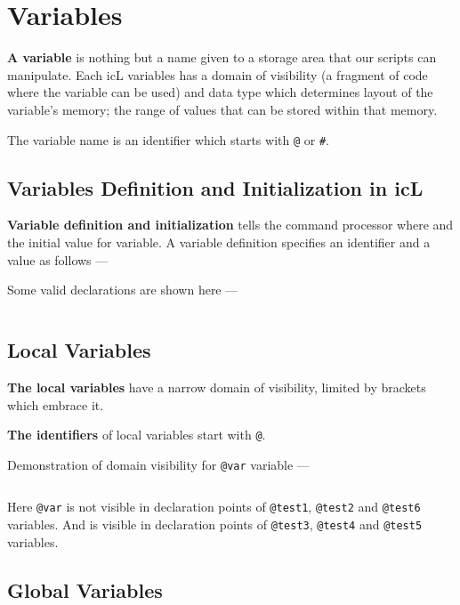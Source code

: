 \section{Variables}

\textbf{A variable} is nothing but a name given to a storage area that our scripts can manipulate. Each icL variables has a domain of visibility (a fragment of code where the variable can be used) and data type which determines layout of the variable's memory; the range of values that can be stored within that memory.

The variable name is an identifier which starts with \texttt{@} or \texttt{#}.

\subsection{Variables Definition and Initialization in icL}

\textbf{Variable definition and initialization} tells the command processor where and the initial value for variable. A variable definition specifies an identifier and a value as follows —

Some valid declarations are shown here —
\inputminted[linenos]{icl}{../sources/initexample.icL}

\subsection{Local Variables}

\textbf{The local variables} have a narrow domain of visibility, limited by brackets which embrace it.

{\bf The identifiers} of local variables start with \texttt{@}.

Demonstration of domain visibility for \texttt{@var} variable —
\inputminted[linenos]{icl}{../sources/localvars.icL}

Here \texttt{@var} is not visible in declaration points of \texttt{@test1}, \texttt{@test2} and \texttt{@test6} variables. And is visible in declaration points of \texttt{@test3}, \texttt{@test4} and \texttt{@test5} variables.

\subsection{Global Variables}

